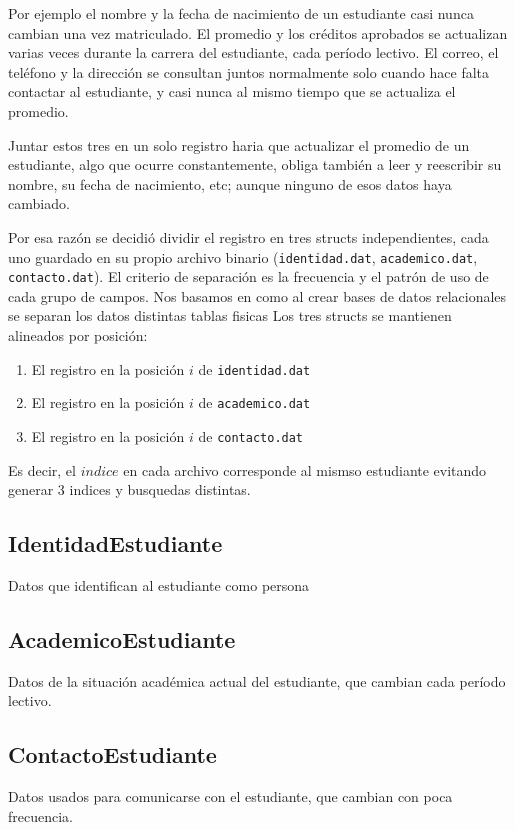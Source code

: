 Por ejemplo el nombre y la fecha de nacimiento de un estudiante casi nunca cambian una vez matriculado. 
El promedio y los créditos aprobados se actualizan varias veces durante la carrera del estudiante, cada período lectivo. 
El correo, el teléfono y la dirección se consultan juntos normalmente solo cuando hace falta contactar al estudiante, y casi nunca al mismo tiempo que se actualiza el promedio.

Juntar estos tres en un solo registro haria que actualizar el promedio de un estudiante, algo que ocurre constantemente, 
obliga también a leer y reescribir su nombre, su fecha de nacimiento, etc; aunque ninguno de esos datos haya cambiado.

Por esa razón se decidió dividir el registro en tres structs independientes, cada uno guardado en su propio archivo binario
\newline
(\texttt{identidad.dat}, \texttt{academico.dat}, \texttt{contacto.dat}).
El criterio de separación es la frecuencia y el patrón de uso de cada grupo de campos. 
Nos basamos en como al crear bases de datos relacionales se separan los datos distintas tablas fisicas
\newline
Los tres structs se mantienen alineados por posición: 
\begin{enumerate}
    \item El registro en la posición $i$ de \texttt{identidad.dat}
    \item El registro en la posición $i$ de \texttt{academico.dat}
    \item El registro en la posición $i$ de \texttt{contacto.dat}
\end{enumerate}
Es decir, el $indice$ en cada archivo corresponde al mismso estudiante evitando generar 3 indices y busquedas distintas.

\subsection{IdentidadEstudiante}
Datos que identifican al estudiante como persona



\subsection{AcademicoEstudiante}
Datos de la situación académica actual del estudiante, que cambian cada período lectivo.



\subsection{ContactoEstudiante}
Datos usados para comunicarse con el estudiante, que cambian con poca frecuencia.


